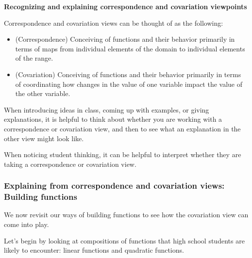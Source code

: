 \documentclass[11pt]{article}
\theoremstyle{definition}
\begin{document}
\begin{mdframed}\raggedright
\begin{center} {\bf Recognizing and explaining correspondence and covariation viewpoints} \end{center}

Correspondence and covariation views can be thought of as the following:
\begin{itemize}
	\item (Correspondence) Conceiving of functions and their behavior primarily in terms of maps from individual elements of the domain to individual elements of the range. 
	\item (Covariation) Conceiving of functions and their behavior primarily in terms of coordinating how changes in the value of one variable impact the value of the other variable.
\end{itemize}

When introducing ideas in class, coming up with examples, or giving explanations, it is helpful to think about whether you are working with a correspondence or covariation view, and then to see what an explanation in the other view might look like. 

When noticing student thinking, it can be helpful to interpret whether they are taking a correspondence or covariation view.
\end{mdframed}

\subsubsection{Explaining from correspondence and covariation views: Building functions}


We now revisit our ways of building functions to see how the covariation view can come into play.

Let's begin by looking at compositions of functions that high school students are likely to encounter: linear functions and quadratic functions. 
\end{document}
